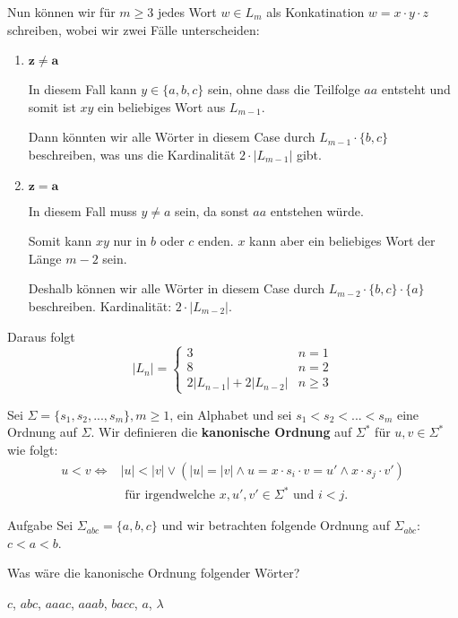 	Nun können wir für $m \geq 3$ jedes Wort $w \in L_m$ als Konkatination $w = x \cdot y \cdot z$ schreiben, wobei wir zwei Fälle unterscheiden:
	
	\begin{enumerate}[label= (\alph*)]
		
		\item $\mathbf{z \neq a}$
		
		In diesem Fall kann $y \in \{a,b,c\}$ sein, ohne dass die Teilfolge $aa$ entsteht und somit ist $xy$ ein beliebiges Wort aus $L_{m-1}$. 
		
		Dann könnten wir alle Wörter in diesem Case durch $L_{m-1}\cdot \{b,c\}$ beschreiben, was uns die Kardinalität $2 \cdot |L_{m-1}|$ gibt.
		
		\item $\mathbf{z = a}$
		
		In diesem Fall muss $y \neq a$ sein, da sonst $aa$ entstehen würde. 
		
		Somit kann $xy$ nur in $b$ oder $c$ enden. $x$ kann aber ein beliebiges Wort der Länge $m-2$ sein. 
		
		Deshalb können wir alle Wörter in diesem Case durch $L_{m-2}\cdot\{b, c\} \cdot \{a\}$ beschreiben. Kardinalität: $2 \cdot |L_{m-2}|$.
	\end{enumerate}

    Daraus folgt $$|L_n| = \begin{cases}
        3 &  n = 1\\
        8 & n = 2\\
        2|L_{n-1}|+ 2|L_{n-2}| &n \geq 3
    \end{cases}$$

\vspace*{1cm}

	
	\begin{mainbox}{}
		Sei $\Sigma = \{s_1,s_2, ...,s_m\}, m \geq 1$, ein Alphabet und sei $s_1 < s_2 < ... <s_m$ eine Ordnung auf $\Sigma$. Wir definieren die \textbf{kanonische Ordnung} auf $\Sigma^*$ für $u, v \in \Sigma^*$ wie folgt:
		\begin{align*}
			u < v \iff &|u| < |v| \lor (|u| = |v| \land u = x\cdot s_i \cdot v = u' \land x \cdot s_j \cdot v') \\
			&\text{ für irgendwelche } x, u', v' \in \Sigma^* \text{ und } i < j. 
		\end{align*}
	\end{mainbox}

	\begin{subbox}{Aufgabe}
		Sei $\Sigma_{abc} = \{a, b, c\}$ und wir betrachten folgende Ordnung auf $\Sigma_{abc}$: $c < a < b$.

	Was wäre die kanonische Ordnung folgender Wörter?

	$c$, $abc$, $aaac$, $aaab$, $bacc$, $a$, $\lambda$
	\end{subbox}
	
